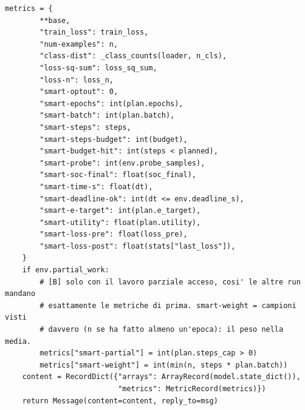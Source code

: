 \documentclass[11pt,a4paper]{article}
\begin{document}
\begin{lstlisting}[style=py,firstnumber=141,caption={\texttt{tesifl/tesiFL/client\_app.py}, lines 141--276}]
    metrics = {
        **base,
        "train_loss": train_loss,
        "num-examples": n,
        "class-dist": _class_counts(loader, n_cls),
        "loss-sq-sum": loss_sq_sum,
        "loss-n": loss_n,
        "smart-optout": 0,
        "smart-epochs": int(plan.epochs),
        "smart-batch": int(plan.batch),
        "smart-steps": steps,
        "smart-steps-budget": int(budget),
        "smart-budget-hit": int(steps < planned),
        "smart-probe": int(env.probe_samples),
        "smart-soc-final": float(soc_final),
        "smart-time-s": float(dt),
        "smart-deadline-ok": int(dt <= env.deadline_s),
        "smart-e-target": int(plan.e_target),
        "smart-utility": float(plan.utility),
        "smart-loss-pre": float(loss_pre),
        "smart-loss-post": float(stats["last_loss"]),
    }
    if env.partial_work:
        # [B] solo con il lavoro parziale acceso, cosi' le altre run mandano
        # esattamente le metriche di prima. smart-weight = campioni visti
        # davvero (n se ha fatto almeno un'epoca): il peso nella media.
        metrics["smart-partial"] = int(plan.steps_cap > 0)
        metrics["smart-weight"] = int(min(n, steps * plan.batch))
    content = RecordDict({"arrays": ArrayRecord(model.state_dict()),
                          "metrics": MetricRecord(metrics)})
    return Message(content=content, reply_to=msg)
\end{lstlisting}
\end{document}
